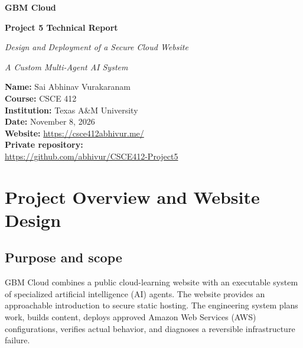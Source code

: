 \documentclass[11pt]{article}
\begin{document}
\hypersetup{pageanchor=false}

\begin{titlepage}
  \centering
  \vspace*{0.5in}
  \gbmlogo\par
  \vspace{0.5in}
  {\LARGE\bfseries GBM Cloud\par}
  \vspace{0.18in}
  {\Large\bfseries Project 5 Technical Report\par}
  \vspace{0.22in}
  {\large\itshape Design and Deployment of a Secure Cloud Website\par}
  \vspace{0.08in}
  {\normalsize\itshape A Custom Multi-Agent AI System\par}
  \vfill
  \begin{minipage}{0.78\textwidth}
    \textbf{Name:} Sai Abhinav Vurakaranam\\[7pt]
    \textbf{Course:} CSCE 412\\[7pt]
    \textbf{Institution:} Texas A\&M University\\[7pt]
    \textbf{Date:} November 8, 2026\\[14pt]
    \textbf{Website:} \url{https://csce412abhivur.me/}\\[7pt]
    \textbf{Private repository:}\\
    \url{https://github.com/abhivur/CSCE412-Project5}
  \end{minipage}
  \vspace*{0.6in}
\end{titlepage}

\hypersetup{pageanchor=true}
\tableofcontents
\clearpage
{}

\section{Project Overview and Website Design}
\subsection{Purpose and scope}
GBM Cloud combines a public cloud-learning website with an executable system of specialized artificial intelligence (AI) agents. The website provides an approachable introduction to secure static hosting. The engineering system plans work, builds content, deploys approved Amazon Web Services (AWS) configurations, verifies actual behavior, and diagnoses a reversible infrastructure failure.
\end{document}
